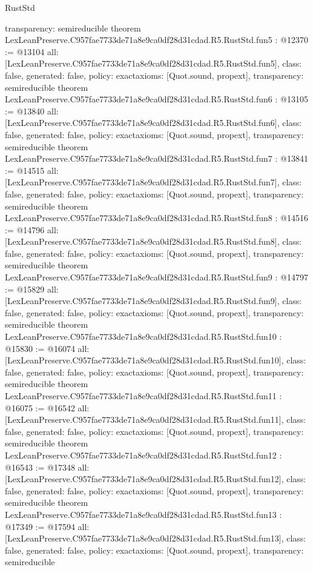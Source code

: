 \begin{lexlean}{RustStd}
\begin{coremodule}
{  transparency: semireducible
}
theorem LexLeanPreserve.C957fae7733de71a8e9ca0df28d31cdad.R5.RustStd.fun5 : @12370 := @13104 {
  all: [LexLeanPreserve.C957fae7733de71a8e9ca0df28d31cdad.R5.RustStd.fun5],
  class: false,
  generated: false,
  policy: exact{axioms: [Quot.sound, propext]},
  transparency: semireducible
}
theorem LexLeanPreserve.C957fae7733de71a8e9ca0df28d31cdad.R5.RustStd.fun6 : @13105 := @13840 {
  all: [LexLeanPreserve.C957fae7733de71a8e9ca0df28d31cdad.R5.RustStd.fun6],
  class: false,
  generated: false,
  policy: exact{axioms: [Quot.sound, propext]},
  transparency: semireducible
}
theorem LexLeanPreserve.C957fae7733de71a8e9ca0df28d31cdad.R5.RustStd.fun7 : @13841 := @14515 {
  all: [LexLeanPreserve.C957fae7733de71a8e9ca0df28d31cdad.R5.RustStd.fun7],
  class: false,
  generated: false,
  policy: exact{axioms: [Quot.sound, propext]},
  transparency: semireducible
}
theorem LexLeanPreserve.C957fae7733de71a8e9ca0df28d31cdad.R5.RustStd.fun8 : @14516 := @14796 {
  all: [LexLeanPreserve.C957fae7733de71a8e9ca0df28d31cdad.R5.RustStd.fun8],
  class: false,
  generated: false,
  policy: exact{axioms: [Quot.sound, propext]},
  transparency: semireducible
}
theorem LexLeanPreserve.C957fae7733de71a8e9ca0df28d31cdad.R5.RustStd.fun9 : @14797 := @15829 {
  all: [LexLeanPreserve.C957fae7733de71a8e9ca0df28d31cdad.R5.RustStd.fun9],
  class: false,
  generated: false,
  policy: exact{axioms: [Quot.sound, propext]},
  transparency: semireducible
}
theorem LexLeanPreserve.C957fae7733de71a8e9ca0df28d31cdad.R5.RustStd.fun10 : @15830 := @16074 {
  all: [LexLeanPreserve.C957fae7733de71a8e9ca0df28d31cdad.R5.RustStd.fun10],
  class: false,
  generated: false,
  policy: exact{axioms: [Quot.sound, propext]},
  transparency: semireducible
}
theorem LexLeanPreserve.C957fae7733de71a8e9ca0df28d31cdad.R5.RustStd.fun11 : @16075 := @16542 {
  all: [LexLeanPreserve.C957fae7733de71a8e9ca0df28d31cdad.R5.RustStd.fun11],
  class: false,
  generated: false,
  policy: exact{axioms: [Quot.sound, propext]},
  transparency: semireducible
}
theorem LexLeanPreserve.C957fae7733de71a8e9ca0df28d31cdad.R5.RustStd.fun12 : @16543 := @17348 {
  all: [LexLeanPreserve.C957fae7733de71a8e9ca0df28d31cdad.R5.RustStd.fun12],
  class: false,
  generated: false,
  policy: exact{axioms: [Quot.sound, propext]},
  transparency: semireducible
}
theorem LexLeanPreserve.C957fae7733de71a8e9ca0df28d31cdad.R5.RustStd.fun13 : @17349 := @17594 {
  all: [LexLeanPreserve.C957fae7733de71a8e9ca0df28d31cdad.R5.RustStd.fun13],
  class: false,
  generated: false,
  policy: exact{axioms: [Quot.sound, propext]},
  transparency: semireducible
}
\end{coremodule}
\end{lexlean}
